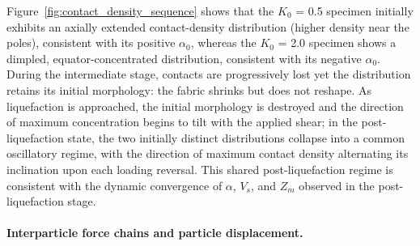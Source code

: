 \documentclass[a4paper,fleqn]{cas-sc}
\newcommand{\Kzero}{\ensuremath{K_0}}
\newcommand{\Zm}{\ensuremath{Z_m}}
\newcommand{\Vs}{\ensuremath{V_s}}
\begin{document}
Figure~\ref{fig:contact_density_sequence} shows that the \Kzero{} = 0.5 specimen initially exhibits an axially extended contact-density distribution (higher density near the poles), consistent with its positive $\alpha_0$, whereas the \Kzero{} = 2.0 specimen shows a dimpled, equator-concentrated distribution, consistent with its negative $\alpha_0$. During the intermediate stage, contacts are progressively lost yet the distribution retains its initial morphology: the fabric shrinks but does not reshape. As liquefaction is approached, the initial morphology is destroyed and the direction of maximum concentration begins to tilt with the applied shear; in the post-liquefaction state, the two initially distinct distributions collapse into a common oscillatory regime, with the direction of maximum contact density alternating its inclination upon each loading reversal. This shared post-liquefaction regime is consistent with the dynamic convergence of $\alpha$, \Vs{}, and \Zm{} observed in the post-liquefaction stage.

\paragraph{Interparticle force chains and particle displacement.}
\end{document}
